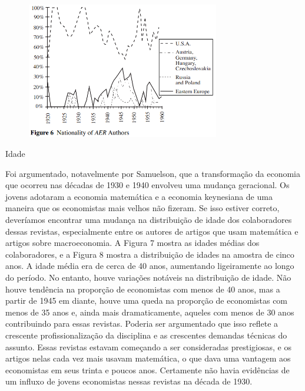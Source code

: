\documentclass[12pt]{article}
\begin{document}
\begin{figure}[H]
    \centering
    \includegraphics[width=0.75\textwidth]{4º Período/História do Pensamento Econômico/Tradução HPE/Tradução Tópico 7.2/figure 6.png}
    \end{figure}

Idade

Foi argumentado, notavelmente por Samuelson, que a transformação da economia que ocorreu nas décadas de 1930 e 1940 envolveu uma mudança geracional. Os jovens adotaram a economia matemática e a economia keynesiana de uma maneira que os economistas mais velhos não fizeram. Se isso estiver correto, deveríamos encontrar uma mudança na distribuição de idade dos colaboradores dessas revistas, especialmente entre os autores de artigos que usam matemática e artigos sobre macroeconomia. A Figura 7 mostra as idades médias dos colaboradores, e a Figura 8 mostra a distribuição de idades na amostra de cinco anos. A idade média era de cerca de 40 anos, aumentando ligeiramente ao longo do período. No entanto, houve variações notáveis na distribuição de idade. Não houve tendência na proporção de economistas com menos de 40 anos, mas a partir de 1945 em diante, houve uma queda na proporção de economistas com menos de 35 anos e, ainda mais dramaticamente, aqueles com menos de 30 anos contribuindo para essas revistas. Poderia ser argumentado que isso reflete a crescente profissionalização da disciplina e as crescentes demandas técnicas do assunto. Essas revistas estavam começando a ser consideradas prestigiosas, e os artigos nelas cada vez mais usavam matemática, o que dava uma vantagem aos economistas em seus trinta e poucos anos. Certamente não havia evidências de um influxo de jovens economistas nessas revistas na década de 1930.
\end{document}
